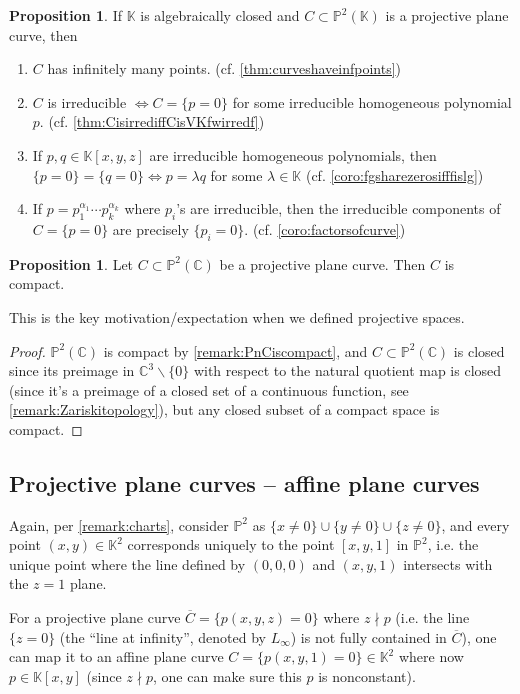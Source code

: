 \documentclass{article}
\newcommand{\C}{\mathbb{C}}
\newcommand{\K}{\mathbb{K}}
\newcommand{\p}{\mathbb{P}}
\theoremstyle{definition}
\newtheorem{prop}[defn]{Proposition}
\begin{document}
\begin{prop}
\label{prop:4resultsofppc}
If $\K$ is algebraically closed and $C\subset\p^2(\K)$ is a projective plane curve, then
\begin{enumerate}
\item $C$ has infinitely many points. (cf. \ref{thm:curveshaveinfpoints})
\item $C$ is irreducible $\iff C=\{p=0\}$ for some irreducible homogeneous polynomial $p$. (cf. \ref{thm:CisirrediffCisVKfwirredf})
\item If $p,q\in\K[x,y,z]$ are irreducible homogeneous polynomials, then $\{p=0\}=\{q=0\}\iff p=\lambda q$ for some $\lambda\in\K$ (cf. \ref{coro:fgsharezerosifffislg})
\item If $p=p_1^{\alpha_1}\cdots p_k^{\alpha_k}$ where $p_i$'s are irreducible, then the irreducible components of $C=\{p=0\}$ are precisely $\{p_i=0\}$. (cf. \ref{coro:factorsofcurve})
\end{enumerate}
\end{prop}

\begin{prop}
Let $C\subset\p^2(\C)$ be a projective plane curve. Then $C$ is compact.

This is the key motivation/expectation when we defined projective spaces.
\end{prop}
\begin{proof}
$\p^2(\C)$ is compact by \ref{remark:PnCiscompact}, and $C\subset\p^2(\C)$ is closed since its preimage in $\C^3\backslash\{0\}$ with respect to the natural quotient map is closed (since it's a preimage of a closed set of a continuous function, see \ref{remark:Zariskitopology}), but any closed subset of a compact space is compact.
\end{proof}

\subsection{Projective plane curves -- affine plane curves}
Again, per \ref{remark:charts}, consider $\p^2$ as $\{x\neq 0\}\cup\{y\neq 0\}\cup\{z\neq 0\}$, and every point $(x,y)\in\K^2$ corresponds uniquely to the point $[x,y,1]$ in $\p^2$, i.e. the unique point where the line defined by $(0,0,0)$ and $(x,y,1)$ intersects with the $z=1$ plane.

For a projective plane curve $\overline C=\{p(x,y,z)=0\}$ where $z\nmid p$ (i.e. the line $\{z=0\}$ (the ``line at infinity'', denoted by $L_\infty$) is not fully contained in $\overline C$), one can map it to an affine plane curve $C=\{p(x,y,1)=0\}\in\K^2$ where now $p\in\K[x,y]$ (since $z\nmid p$, one can make sure this $p$ is nonconstant).
\end{document}
